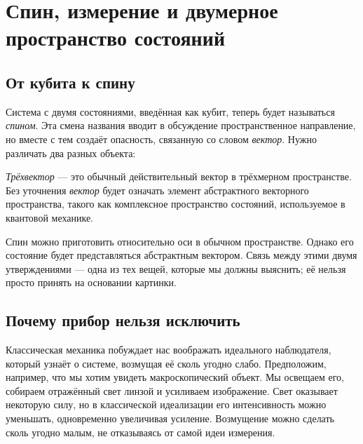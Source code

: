 \chapter{Спин, измерение и двумерное пространство состояний}


\section{От кубита к спину}

Система с двумя состояниями, введённая как кубит, теперь будет называться \emph{спином}. Эта смена названия вводит в обсуждение пространственное направление, но вместе с тем создаёт опасность, связанную со словом \emph{вектор}. Нужно различать два разных объекта:

\begin{definition}
\emph{Трёхвектор} — это обычный действительный вектор в трёхмерном пространстве. Без уточнения \emph{вектор} будет означать элемент абстрактного векторного пространства, такого как комплексное пространство состояний, используемое в квантовой механике.
\end{definition}

Спин можно приготовить относительно оси в обычном пространстве. Однако его состояние будет представляться абстрактным вектором. Связь между этими двумя утверждениями — одна из тех вещей, которые мы должны выяснить; её нельзя просто принять на основании картинки.

\section{Почему прибор нельзя исключить}

Классическая механика побуждает нас воображать идеального наблюдателя, который узнаёт о системе, возмущая её сколь угодно слабо. Предположим, например, что мы хотим увидеть макроскопический объект. Мы освещаем его, собираем отражённый свет линзой и усиливаем изображение. Свет оказывает некоторую силу, но в классической идеализации его интенсивность можно уменьшать, одновременно увеличивая усиление. Возмущение можно сделать сколь угодно малым, не отказываясь от самой идеи измерения.

